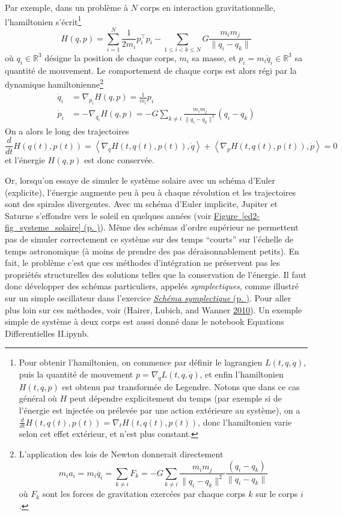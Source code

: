 Par exemple, dans un problème à \(N\) corps en interaction
gravitationnelle, l'hamiltonien s'écrit\footnote{Pour obtenir
  l'hamiltonien, on commence par définir le lagrangien
  \(L(t,q,\dot{q})\), puis la quantité de mouvement
  \(p = \nabla_{\dot{q}} L(t,q,\dot{q})\), et enfin l'hamiltonien
  \(H(t,q,p)\) est obtenu par transformée de Legendre. Notons que dans
  ce cas général où \(H\) peut dépendre explicitement du temps (par
  exemple si de l'énergie est injectée ou prélevée par une action
  extérieure au système), on a
  \(\frac{d}{dt}H(t,q(t),p(t)) = \nabla_t H(t,q(t),p(t))\), donc
  l'hamiltonien varie selon cet effet extérieur, et n'est plus constant.}
\[
H(q,p) = \sum_{i=1}^{N} \frac{1}{2 m_i}p_i^\top p_i  - \sum_{1\leq i< k \leq N} G\frac{m_i m_j}{\|q_i-q_k\|}
\] où \(q_i\in \mathbb{R}^3\) désigne la position de chaque corps,
\(m_i\) sa masse, et \(p_i=m_i\dot{q}_i\in \mathbb{R}^3\) sa quantité de
mouvement. Le comportement de chaque corps est alors régi par la
dynamique hamiltonienne\footnote{L'application des lois de Newton
  donnerait directement \[
  m_i a_i = m_i \ddot{q_i} =  \sum_{k\neq i} F_k = -G \sum_{k\neq i} \frac{m_i m_j}{\|q_i-q_k\|^2}\frac{(q_i-q_k)}{\|q_i-q_k\|}
  \] où \(F_k\) sont les forces de gravitation exercées par chaque corps
  \(k\) sur le corps \(i\).} \begin{align*}
\dot{q}_i &= \nabla_{p_i} H(q,p) = \frac{1}{m_i} p_i \\
\dot{p}_i &= -\nabla_{q_i} H(q,p) = -G \sum_{k\neq i} \frac{m_i m_j}{\|q_i-q_k\|^3}(q_i-q_k)
\end{align*} On a alors le long des trajectoires \[
\frac{d}{dt}H(q(t),p(t)) = \left< \nabla_q H(t,q(t),p(t)), \dot{q} \right> + \left< \nabla_p H(t,q(t),p(t)), \dot{p} \right> = 0
\] et l'énergie \(H(q,p)\) est donc conservée.

Or, lorsqu'on essaye de simuler le système solaire avec un schéma
d'Euler (explicite), l'énergie augmente peu à peu à chaque révolution et
les trajectoires sont des spirales divergentes. Avec un schéma d'Euler
implicite, Jupiter et Saturne s'effondre vers le soleil en quelques ann\'ees (voir \protect\hyperlink{ed2-fig_systeme_solaire}{Figure~\ref*{ed2-fig_systeme_solaire} (p.
\pageref*{ed2-fig_systeme_solaire})}). Même des schémas d'ordre supérieur ne permettent
pas de simuler correctement ce système sur des temps ``courts'' sur
l'échelle de temps astronomique (à moins de prendre des pas
déraisonnablement petits). En fait, le problème c'est que ces méthodes
d'intégration ne préservent pas les propriétés structurelles des
solutions telles que la conservation de l'énergie. Il faut donc
développer des schémas particuliers, appelés \emph{symplectiques}, comme
illustré sur un simple oscillateur dans l'exercice
\protect\hyperlink{ed2-exo_symplectique}{\emph{Schéma symplectique} (p.
\pageref*{ed2-exo_symplectique})}. Pour aller plus loin sur ces méthodes,
voir (Hairer, Lubich, and Wanner
\protect\hyperlink{ed2-ref-Hairer10}{2010}). Un exemple simple de système à
deux corps est aussi donné dans le notebook Equations Differentielles
II.ipynb.

